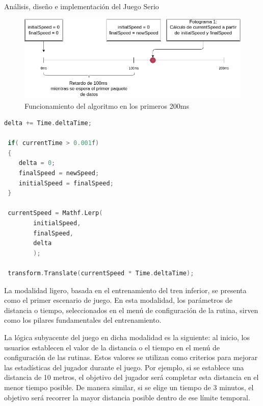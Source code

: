 \begin{thesischapter}{2} {Análisis, diseño e implementación del Juego Serio}
    \begin{figure}[ht]
        \centering
        \includegraphics[scale=0.4]{images/interpolation-algorithm.png}
        \caption{Funcionamiento del algoritmo en los primeros 200ms}
        \label{fig: interpolation-algorithm}
    \end{figure}

\begin{center}
\begin{minipage}{0.8\textwidth}
\begin{lstlisting}[language=c, label={code: interpolation}, caption={Controlador de movimiento}]
 delta += Time.deltaTime;
 
 if( currentTime > 0.001f)
 {
    delta = 0;
    finalSpeed = newSpeed;
    initialSpeed = finalSpeed;
 }

 currentSpeed = Mathf.Lerp( 
        initialSpeed, 
        finalSpeed, 
        delta
        );

 transform.Translate(currentSpeed * Time.deltaTime);
\end{lstlisting}
\end{minipage}
\end{center}


    La modalidad ligero, basada en el entrenamiento del tren inferior, se presenta como el primer escenario de juego. En esta 
    modalidad, los parámetros de distancia o tiempo, seleccionados en el menú de configuración de la rutina, sirven como los pilares 
    fundamentales del entrenamiento.

    \vspace{10pt}
    La lógica subyacente del juego en dicha modalidad es la siguiente: al inicio, los usuarios establecen el valor de la distancia o el tiempo en el menú de configuración de las rutinas. Estos valores se utilizan como criterios para mejorar las estadísticas del jugador durante el juego. Por ejemplo, si se establece una distancia de 10 metros, el objetivo del jugador será completar esta distancia en el menor tiempo posible. De manera similar, si se elige un tiempo de 3 minutos, el objetivo será recorrer la mayor distancia posible dentro de ese límite temporal.


\end{thesischapter}
